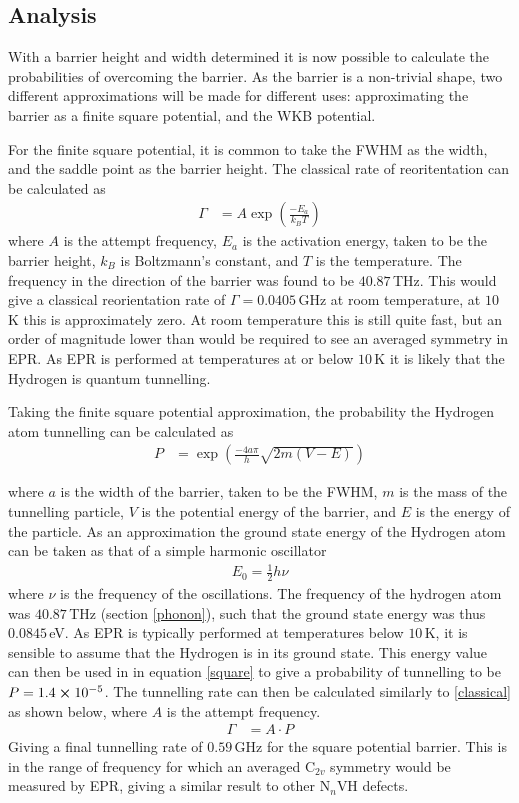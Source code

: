 \documentclass[10pt,a4paper,twocolumn,twoside]{extarticle}
\begin{document}
\subsection{Analysis}
With a barrier height and width determined it is now possible to calculate the probabilities of overcoming the barrier. As the barrier is a non-trivial shape, two different approximations will be made for different uses: approximating the barrier as a finite square potential, and the WKB potential. 

For the finite square potential, it is common to take the FWHM as the width, and the saddle point as the barrier height. The classical rate of reoritentation can be calculated as 
\begin{align}
    \label{classical}
    \Gamma &= A\exp({\frac{-E_a}{k_BT}})
\end{align}
where $A$ is the attempt frequency, $E_a$ is the activation energy, taken to be the barrier height, $k_B$ is Boltzmann's constant, and $T$ is the temperature. The frequency in the direction of the barrier was found to be $40.87$\,THz. This would give a classical reorientation rate of $\Gamma = 0.0405$\,GHz at room temperature, at $10$\,K this is approximately zero. At room temperature this is still quite fast, but an order of magnitude lower than would be required to see an averaged symmetry in EPR. As EPR is performed at temperatures at or below $10$\,K it is likely that the Hydrogen is quantum tunnelling. 

Taking the finite square potential approximation, the probability the Hydrogen atom tunnelling can be calculated as 
\begin{align}
    \label{square}
    P &= \exp(\frac{-4a\pi}{h}\sqrt{2m(V-E)})
\end{align}

where $a$ is the width of the barrier, taken to be the FWHM, $m$ is the mass of the tunnelling particle, $V$ is the potential energy of the barrier, and $E$ is the energy of the particle. As an approximation the ground state energy of the Hydrogen atom can be taken as that of a simple harmonic oscillator 
\begin{align}
    E_0 = \frac{1}{2}h\nu
\end{align}
where $\nu$ is the frequency of the oscillations. The frequency of the hydrogen atom was $40.87$\,THz (section \ref{phonon}), such that the ground state energy was thus $0.0845$\,eV. As EPR is typically performed at temperatures below $10$\,K, it is sensible to assume that the Hydrogen is in its ground state. This energy value can then be used in in equation \ref{square} to give a probability of tunnelling to be $P = 1.4\cross10^{-5}$. The tunnelling rate can then be calculated similarly to \ref{classical} as shown below, where $A$ is the attempt frequency. 
\begin{align}
    \Gamma &= A\cdot P
\end{align}
Giving a final tunnelling rate of $0.59$\,GHz for the square potential barrier. This is in the range of frequency for which an averaged C$_{2v}$ symmetry would be measured by EPR, giving a similar result to other N$_{n}$VH defects.
\end{document}
